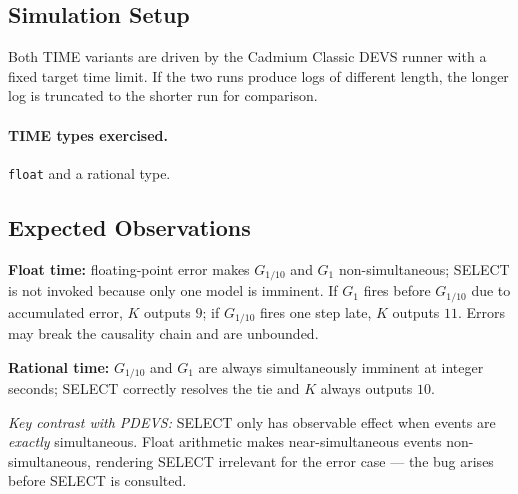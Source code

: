 \subsection*{Simulation Setup}

Both TIME variants are driven by the Cadmium Classic DEVS runner with a
fixed target time limit.  If the two runs produce logs of different
length, the longer log is truncated to the shorter run for comparison.

\paragraph{TIME types exercised.} \texttt{float} and a rational type.

\subsection*{Expected Observations}

\textbf{Float time:} floating-point error makes $G_{1/10}$ and $G_1$
non-simultaneous; SELECT is not invoked because only one model is
imminent.  If $G_1$ fires before $G_{1/10}$ due to accumulated error,
$K$ outputs $9$; if $G_{1/10}$ fires one step late, $K$ outputs $11$.
Errors may break the causality chain and are unbounded.

\textbf{Rational time:} $G_{1/10}$ and $G_1$ are always simultaneously
imminent at integer seconds; SELECT correctly resolves the tie and $K$
always outputs $10$.

\textit{Key contrast with PDEVS:} SELECT only has observable effect
when events are \emph{exactly} simultaneous.  Float arithmetic makes
near-simultaneous events non-simultaneous, rendering SELECT irrelevant
for the error case --- the bug arises before SELECT is consulted.
